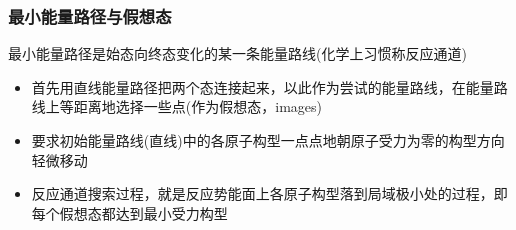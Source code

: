 \frame
{
	\frametitle{最小能量路径与假想态}
	最小能量路径是始态向终态变化的某一条能量路线(化学上习惯称反应通道)%
	\begin{itemize}
		\item 首先用直线能量路径把两个态连接起来，以此作为尝试的能量路线，在能量路线上等距离地选择一些点(作为假想态，\textrm{images})\\%
			{\fontsize{7.2pt}{5.2pt}\selectfont{注意每个假想态表示的是反应过程中的一个特定的中间构型，假想态的数目则依赖于能量路线的复杂性}}%
		\item 要求初始能量路线(直线)中的各原子构型一点点地朝原子受力为零的构型方向轻微移动\\%
			{\fontsize{7.2pt}{5.2pt}\selectfont{为控制能量路线的移动，对能量路线上的等间距分布的假想态施加沿特定方向的弹性应力，确保能量路线连续地朝最小能量路径方向过渡}}%
		\item 反应通道搜索过程，就是反应势能面上各原子构型落到局域极小处的过程，即每个假想态都达到最小受力构型%
	\end{itemize}
}

